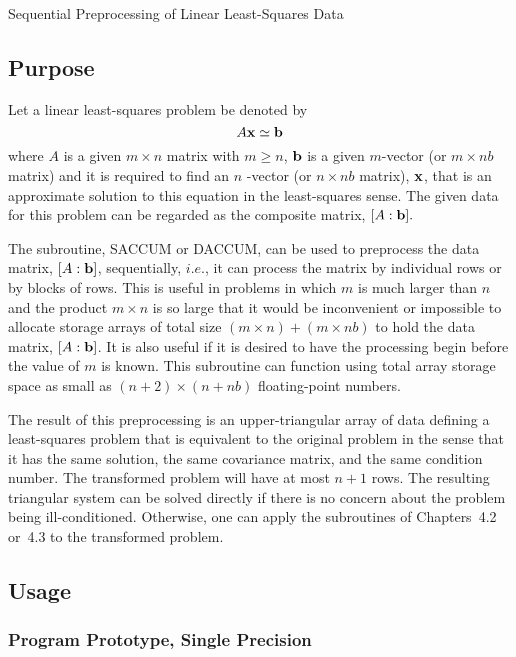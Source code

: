 \documentclass[twoside]{MATH77}
\begin{document}
 Sequential Preprocessing of Linear Least-Squares Data


\subsection{Purpose}

Let a linear least-squares problem be denoted by
\begin{equation*}
A{\bf x} \simeq {\bf b}
\end{equation*}
where $A$ is a given $m\times n$ matrix with $m \geq n$, ${\bf b}$ is a
given $m$-vector (or $m\times nb$ matrix) and it is required to find an $n$%
-vector (or $n\times nb$ matrix), ${\bf x}$, that is an approximate solution
to this equation in the least-squares sense. The given data for this problem
can be regarded as the composite matrix, $[A:{\bf b}].$

The subroutine, SACCUM or DACCUM, can be used to preprocess the data matrix,
$[A:{\bf b}]$, sequentially, $i.e.$, it can process the matrix by individual
rows or by blocks of rows. This is useful in problems in which $m$ is much
larger than $n$ and the product $m\times n$ is so large that it would be
inconvenient or impossible to allocate storage arrays of total size
$( m\times n) + (m\times nb)$ to hold the data matrix, $[A:{\bf b}]$. It is also useful if
it is desired to have the processing begin before the value of $m$ is known.
This subroutine can function using total array storage space as small as $%
(n+2)\times (n+nb)$ floating-point numbers.

The result of this preprocessing is an upper-triangular array of data
defining a least-squares problem that is equivalent to the original problem
in the sense that it has the same solution, the same covariance matrix, and
the same condition number. The transformed problem will have at most $n + 1$
rows. The resulting triangular system can be solved directly if there is no
concern about the problem being ill-conditioned. Otherwise, one can apply
the subroutines of Chapters~4.2 or~4.3 to the transformed problem.

\subsection{Usage}

\subsubsection{Program Prototype, Single Precision}
\end{document}
